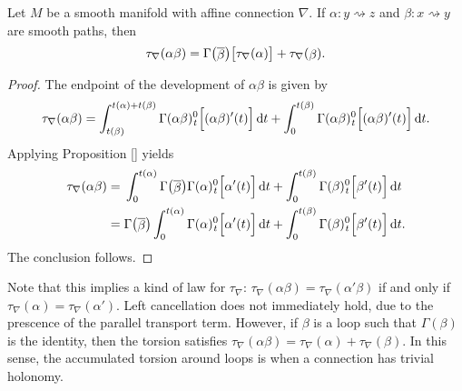 \begin{proposition}
  Let $M$ be a smooth manifold with affine connection $\nabla$. If $\alpha \colon y \rightsquigarrow z$ and $\beta \colon x \rightsquigarrow y$ are smooth paths, then
  \begin{equation}
    \tau_\nabla (\alpha \beta) = \Gamma\big(\raisebox{-1pt}{$\overline{\beta}$}\big) \big[ \tau_\nabla (\alpha) \big] + \tau_\nabla(\raisebox{-1pt}{$\beta$}). 
  \end{equation}
\end{proposition}
\begin{proof}
  The endpoint of the development of $\alpha \beta$ is given by
  \begin{equation}
    \tau_\nabla(\alpha\beta) = \int_{t(\beta)}^{t(\alpha) + t(\beta)} \Gamma(\alpha \beta)_{\hspace{0.5pt}t}^0 \Big[ (\alpha \beta)'(t)\Big] \, {\rm d} t  + \int_{0}^{t(\beta)} \Gamma(\alpha \beta)_{\hspace{0.5pt}t}^0 \Big[ (\alpha \beta)'(t)\Big] \, {\rm d} t.
  \end{equation}
  Applying Proposition \ref{} yields
  \begin{align}
    \tau_\nabla(\alpha\beta) &= \,\int_{0}^{t(\alpha)} \Gamma\big(\raisebox{-1pt}{$\overline{\beta}$}\big)\Gamma(\alpha)_{\hspace{0.5pt}t}^0 \Big[ \alpha'(t)\Big] \, \d t + \int_{0}^{t(\beta)} \Gamma(\beta)_{\hspace{0.5pt}t}^0 \Big[ \beta'(t)\Big] \, \d t \\
    &= \Gamma\big(\raisebox{-1pt}{$\overline{\beta}$}\big) \int_{0}^{t(\alpha)} \Gamma(\alpha)_{\hspace{0.5pt}t}^0 \Big[ \alpha'(t)\Big] \, \d t + \int_{0}^{t(\beta)} \Gamma(\beta)_{\hspace{0.5pt}t}^0 \Big[ \beta'(t)\Big] \, \d t.
  \end{align}
  The conclusion follows.
\end{proof}

Note that this implies a kind of  law for $\tau_\nabla$: $\tau_\nabla(\alpha \beta) = \tau_\nabla(\alpha' \beta)$ if and only if $\tau_\nabla(\alpha) = \tau_\nabla(\alpha')$. Left cancellation does not immediately hold, due to the prescence of the parallel transport term. However, if $\beta$ is a loop such that $\Gamma(\beta)$ is the identity, then the torsion satisfies $\tau_\nabla(\alpha\beta) = \tau_\nabla(\alpha) + \tau_\nabla(\beta)$. In this sense, the accumulated torsion around loops is  when a connection has trivial holonomy. 
 

